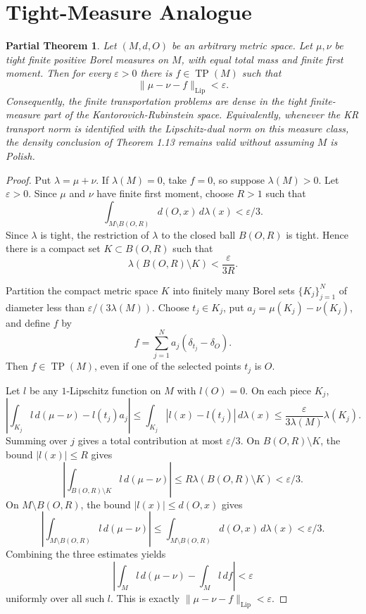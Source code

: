 \documentclass[11pt]{article}
\newtheorem*{theorem}{Partial Theorem}
\newcommand{\Lip}{\operatorname{Lip}}
\newcommand{\TP}{\operatorname{TP}}
\begin{document}
\section*{Tight-Measure Analogue}

\begin{theorem}
Let \((M,d,O)\) be an arbitrary metric space. Let \(\mu,\nu\) be tight finite
positive Borel measures on \(M\), with equal total mass and finite first
moment. Then for every \(\varepsilon>0\) there is \(f\in \TP(M)\) such that
\[
\|\mu-\nu-f\|_{\Lip}<\varepsilon.
\]
Consequently, the finite transportation problems are dense in the tight
finite-measure part of the Kantorovich-Rubinstein space. Equivalently, whenever
the KR transport norm is identified with the Lipschitz-dual norm on this
measure class, the density conclusion of Theorem 1.13 remains valid without
assuming \(M\) is Polish.
\end{theorem}

\begin{proof}
Put \(\lambda=\mu+\nu\). If \(\lambda(M)=0\), take \(f=0\), so suppose
\(\lambda(M)>0\). Let \(\varepsilon>0\). Since \(\mu\) and \(\nu\) have finite
first moment, choose \(R>1\) such that
\[
\int_{M\setminus B(O,R)} d(O,x)\,d\lambda(x)<\varepsilon/3.
\]
Since \(\lambda\) is tight, the restriction of \(\lambda\) to the closed ball
\(B(O,R)\) is tight. Hence there is a compact set \(K\subset B(O,R)\) such
that
\[
\lambda(B(O,R)\setminus K)<\frac{\varepsilon}{3R}.
\]

Partition the compact metric space \(K\) into finitely many Borel sets
\(\{K_j\}_{j=1}^N\) of diameter less than
\(\varepsilon/(3\lambda(M))\). Choose \(t_j\in K_j\), put
\(a_j=\mu(K_j)-\nu(K_j)\), and define \(f\) by
\[
f=\sum_{j=1}^N a_j(\delta_{t_j}-\delta_O).
\]
Then \(f\in\TP(M)\), even if one of the selected points \(t_j\) is \(O\).

Let \(l\) be any \(1\)-Lipschitz function on \(M\) with \(l(O)=0\). On each
piece \(K_j\),
\[
\left|\int_{K_j} l\,d(\mu-\nu)-l(t_j)a_j\right|
\le \int_{K_j}|l(x)-l(t_j)|\,d\lambda(x)
\le \frac{\varepsilon}{3\lambda(M)}\lambda(K_j).
\]
Summing over \(j\) gives a total contribution at most \(\varepsilon/3\). On
\(B(O,R)\setminus K\), the bound \(|l(x)|\le R\) gives
\[
\left|\int_{B(O,R)\setminus K} l\,d(\mu-\nu)\right|
\le R\lambda(B(O,R)\setminus K)<\varepsilon/3.
\]
On \(M\setminus B(O,R)\), the bound \(|l(x)|\le d(O,x)\) gives
\[
\left|\int_{M\setminus B(O,R)} l\,d(\mu-\nu)\right|
\le \int_{M\setminus B(O,R)}d(O,x)\,d\lambda(x)<\varepsilon/3.
\]
Combining the three estimates yields
\[
\left|\int_M l\,d(\mu-\nu)-\int_M l\,df\right|<\varepsilon
\]
uniformly over all such \(l\). This is exactly
\(\|\mu-\nu-f\|_{\Lip}<\varepsilon\).
\end{proof}
\end{document}
